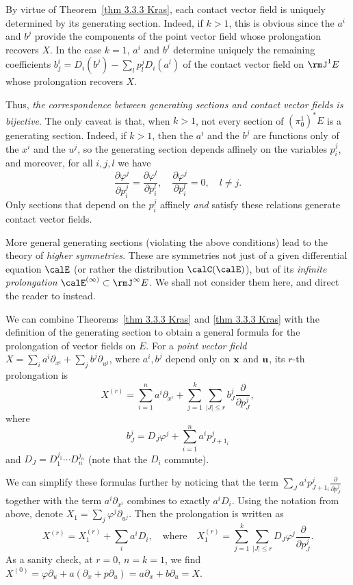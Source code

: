 By virtue of Theorem~\ref{thm 3.3.3 Kras}, each contact vector field is uniquely determined by its generating section. Indeed, if $k>1$, this is obvious since the $a^i$ and $b^j$ provide the components of the point vector field whose prolongation recovers $X$. In the case $k=1$, $a^i$ and $b^j$ determine uniquely the remaining coefficients $b^i_j=D_i(b^j)-\sum_l p^j_l D_i(a^l)$ of the contact vector field on $\rmJ^1E$ whose prolongation recovers $X$. 

Thus, \emph{the correspondence between generating sections and contact vector fields is bijective}. 
The only caveat is that, when $k>1$, not every section of $(\pi^1_0)^\ast E$ is a generating section. Indeed, if $k>1$, then the $a^i$ and the $b^j$ are functions only of the $x^i$ and the $u^j$, so the generating section depends affinely on the variables $p^j_i$, and moreover, for all $i,j,l$ we have 
\[\frac{\partial \varphi^j}{\partial p^j_i}=\frac{\partial\varphi^l}{\partial p^l_i},\quad \frac{\partial\varphi^j}{\partial p^l_i}=0,\quad l\neq j.\]
Only sections that depend on the $p^j_i$ affinely \emph{and} satisfy these relations generate contact vector fields. 

\begin{rem}
    More general generating sections (violating the above conditions) lead to the theory of \emph{higher symmetries}. These are symmetries not just of a given differential equation $\calE$ (or rather the distribution $\calC(\calE)$), but of its \emph{infinite prolongation} $\calE^{(\infty)}\subset \rmJ^\infty E$. We shall not consider them here, and direct the reader to \cite[Ch.~4]{Kras} instead.
\end{rem}


\begin{rem}\label{rem prolong of point fields}
    We can combine Theorems~\ref{thm 3.3.3 Kras} and \ref{thm 3.3.3 Kras} with the definition of the generating section to obtain a general formula for the prolongation of vector fields on $E$. For a \emph{point vector field} $X=\sum_i a^i\partial_{x^i}+\sum_j b^j\partial_{u^j}$, where $a^i,b^j$ depend only on $\bf{x}$ and $\bf{u}$, its $r$-th prolongation is
    \[X^{(r)}=\sum_{i=1}^n a^i\partial_{x^i}+\sum_{j=1}^k\sum_{|J|\leq r}b^j_J\frac{\partial}{\partial p^j_J},\]
    where 
    \[b^j_J=D_J \varphi^j+\sum_{i=1}^n a^i p^j_{J+1_i}\]
    and $D_J=D_1^{j_1}\cdots D_n^{j_n}$ (note that the $D_i$ commute).

    We can simplify these formulas further by noticing that the term $\sum_J a^ip^j_{J+1_i}\frac{\partial}{\partial p^j_J}$ together with the term $a^i\partial_{x^i}$ combines to exactly $a^i D_i$. Using the notation from above, denote $X_1=\sum_j \varphi^j \partial_{u^j}$. Then the prolongation is written as
    \[X^{(r)}=X_1^{(r)}+\sum_i a^i D_i,\quad \text{where}\quad X_1^{(r)}=\sum_{j=1}^k \sum_{|J|\leq r} D_J \varphi^j \frac{\partial}{\partial p^j_J}.\]
    As a sanity check, at $r=0$, $n=k=1$, we find $X^{(0)}=\varphi\partial_u+a(\partial_x+p\partial_u)=a\partial_x+b\partial_u=X$.
\end{rem}


